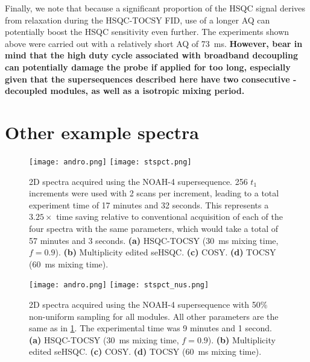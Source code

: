 Finally, we note that because a significant proportion of the HSQC signal derives from  relaxation during the HSQC-TOCSY FID, use of a longer AQ can potentially boost the HSQC sensitivity even further.
The experiments shown above were carried out with a relatively short AQ of \SI{73}{\ms}.
\textbf{However, bear in mind that the high duty cycle associated with broadband  decoupling can potentially damage the probe if applied for too long, especially given that the supersequences described here have two consecutive -decoupled modules, as well as a  isotropic mixing period.}

\section{Other example spectra}
\label{section:si_spectra}

\begin{figure}
    \centering
    \texttt{[image: andro.png]}\phantom{aaaaaa}
    \texttt{[image: stspct.png]}
    \caption{
        2D spectra acquired using the NOAH-4  supersequence.
        256 $t_1$ increments were used with 2 scans per increment, leading to a total experiment time of 17 minutes and 32 seconds.
        This represents a $3.25\times$ time saving relative to conventional acquisition of each of the four spectra with the same parameters, which would take a total of 57 minutes and 3 seconds.
        \textbf{(a)} HSQC-TOCSY (\SI{30}{ms} mixing time, $f = 0.9$).
        \textbf{(b)} Multiplicity edited seHSQC.
        \textbf{(c)} COSY.
        \textbf{(d)} TOCSY (\SI{60}{ms} mixing time).
        \andro{}
    }
    \label{fig:stspct}
\end{figure}

\begin{figure}
    \centering
    \texttt{[image: andro.png]}\phantom{aaaaaa}
    \texttt{[image: stspct\_nus.png]}
    \caption{
        2D spectra acquired using the NOAH-4  supersequence with 50\% non-uniform sampling for all modules.
        All other parameters are the same as in \cref{fig:stspct}.
        The experimental time was 9 minutes and 1 second.
        \textbf{(a)} HSQC-TOCSY (\SI{30}{ms} mixing time, $f = 0.9$).
        \textbf{(b)} Multiplicity edited seHSQC.
        \textbf{(c)} COSY.
        \textbf{(d)} TOCSY (\SI{60}{ms} mixing time).
        \andro{}
    }
    \label{fig:stspct_nus}
\end{figure}

